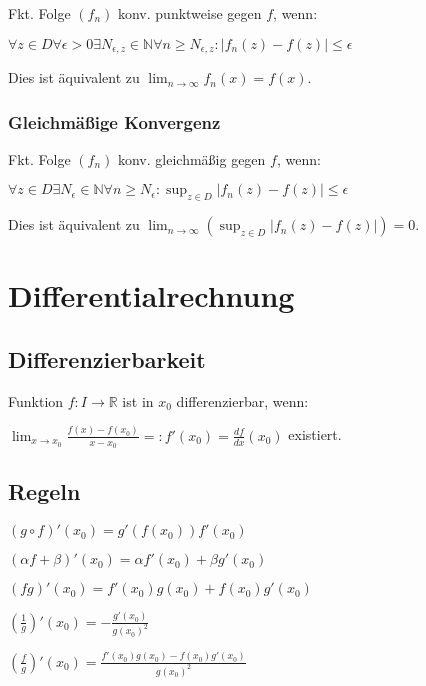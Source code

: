 Fkt. Folge $(f_n)$ konv. punktweise gegen $f$, wenn:

$\forall z \in D \forall \epsilon > 0 \exists N_{\epsilon, z} \in \mathbb{N} \forall n \geq N_{\epsilon, z} : | f_n(z) - f(z) | \leq \epsilon$

Dies ist äquivalent zu $\lim_{n\to \infty} f_n(x)=f(x)$.

\subsubsection*{Gleichmäßige Konvergenz}

Fkt. Folge $(f_n)$ konv. gleichmäßig gegen $f$, wenn:

$\forall z \in D \exists N_\epsilon \in \mathbb{N} \forall n \geq N_\epsilon : \sup_{z \in D} | f_n(z) - f(z) | \leq \epsilon$

Dies ist äquivalent zu $\displaystyle\lim_{n\to \infty}(\sup_{z \in D}| f_n(z) - f(z) |) = 0$.

\section*{Differentialrechnung}

\subsection*{Differenzierbarkeit}

Funktion $f : I \rightarrow \mathbb{R}$ ist in $x_0$ differenzierbar, wenn:

$\lim_{x \to x_0} \frac{f(x) - f(x_0)}{x - x_0} =: f'(x_0) = \frac{df}{dx}(x_0)$ existiert.

\subsection*{Regeln}

\begin{description}[leftmargin=!,labelwidth=17mm]
	\item[Ketten]     $(g \circ f)'(x_0) =g'(f(x_0))f'(x_0)$
	\item[Produkt]    $(\alpha f + \beta)'(x_0) = \alpha f'(x_0) + \beta g'(x_0)$
	\item[ ]          $(fg)'(x_0) = f'(x_0)g(x_0) + f(x_0)g'(x_0)$
	\item[Quotienten] $(\frac{1}{g})'(x_0) = - \frac{g'(x_0)}{g(x_0)^2}$
	\item[ ]          $(\frac{f}{g})'(x_0) = \frac{f'(x_0)g(x_0) - f(x_0)g'(x_0)}{g(x_0)^2}$
\end{description}

